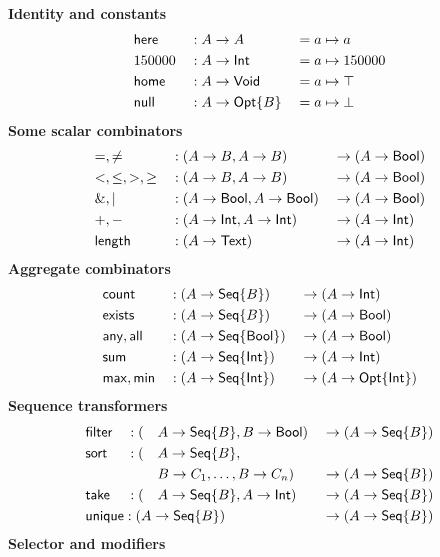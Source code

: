 
\begin{table}
    \begin{framed}
    \textbf{Identity and constants}
    \begin{alignat*}{3}
        & \mathsf{here} && : A \to A && = a \mapsto a \\
        & 150000 && : A \to \mathsf{Int} && = a \mapsto 150000 \\
        & \mathsf{home} && : A \to \mathsf{Void} && = a \mapsto \top \\
        & \mathsf{null} && : A \to \mathsf{Opt}{\left\{B\right\}} && = a \mapsto \bot
    \end{alignat*}
    \textbf{Some scalar combinators}
    \begin{alignat*}{3}
        & {=},{\ne} && : (A \to B, A \to B) && \to (A \to \mathsf{Bool}) \\
        & {<},{\le},{>},{\ge} && : (A \to B, A \to B) && \to (A \to \mathsf{Bool}) \\
        & {\&},{|} && : (A \to \mathsf{Bool}, A \to \mathsf{Bool}) && \to (A \to \mathsf{Bool}) \\
        & {+},{-} && : (A \to \mathsf{Int}, A \to \mathsf{Int}) && \to (A \to \mathsf{Int}) \\
        & \mathsf{length} && : (A \to \mathsf{Text}) && \to (A \to \mathsf{Int})
    \end{alignat*}
    \textbf{Aggregate combinators}
    \begin{alignat*}{3}
        & \mathsf{count} && : (A \to \mathsf{Seq}{\left\{B\right\}}) && \to (A \to \mathsf{Int}) \\
        & \mathsf{exists} && : (A \to \mathsf{Seq}{\left\{B\right\}}) && \to (A \to \mathsf{Bool}) \\
        & \mathsf{any}, \mathsf{all} && : (A \to \mathsf{Seq}{\left\{\mathsf{Bool}\right\}}) && \to (A \to \mathsf{Bool}) \\
        & \mathsf{sum} && : (A \to \mathsf{Seq}{\left\{\mathsf{Int}\right\}}) && \to (A \to \mathsf{Int}) \\
        & \mathsf{max}, \mathsf{min} && : (A \to \mathsf{Seq}{\left\{\mathsf{Int}\right\}}) && \to (A \to \mathsf{Opt}{\left\{\mathsf{Int}\right\}})
    \end{alignat*}
    \textbf{Sequence transformers}
    \begin{alignat*}{4}
        & \Filter && : (&& A \to \Seq{B}, B \to \Bool) && \to (A \to \Seq{B}) \\
        & \Sort && : (&& A \to \Seq{B}, && \\
        & && && B \to C_1, \ldots, B \to C_n) && \to (A \to \Seq{B}) \\
        & \Take && : (&& A \to \Seq{B}, A \to \Int) && \to (A \to \Seq{B}) \\
        & \Unique : (A \to \Seq{B})\hidewidth && && && \to (A \to \Seq{B})
    \end{alignat*}
    \textbf{Selector and modifiers}

\end{framed}
\end{table}
